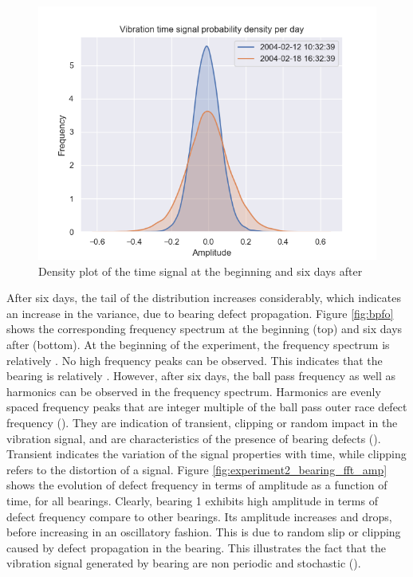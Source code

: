 \documentclass[../Main/thesis.tex]{subfiles}
\begin{document}
\begin{figure}[H]
	\centering
	\includegraphics[width=0.7\linewidth]{../fig/bpfo/density_bpfo_signal}
	\caption{Density plot of the time signal at the beginning and six days after}
	\label{fig:bpfo_density}
\end{figure}
\justify
After six days, the tail of the distribution increases considerably, which indicates an increase in the variance, due to bearing defect propagation. Figure \ref{fig:bpfo} shows the corresponding frequency spectrum at the beginning (top) and six days after (bottom). At the beginning of the experiment, the frequency spectrum is relatively . No high frequency peaks can be observed. This indicates that the bearing is relatively . However, after six days, the ball pass frequency as well as harmonics can be observed in the frequency spectrum.
\justify
Harmonics are evenly spaced frequency peaks that are integer multiple of the ball pass outer race defect frequency (\cite{mobius2014}). They are indication of transient, clipping or random impact in the vibration signal, and are characteristics of the presence of bearing defects (\cite{mobius2014}). Transient indicates the variation of the signal properties with time, while clipping refers to the distortion of a signal. 
\justify
 Figure \ref{fig:experiment2_bearing_fft_amp} shows the evolution of defect frequency in terms of amplitude as a function of time, for all  bearings. Clearly, bearing 1 exhibits high amplitude in terms of defect frequency compare to other bearings. Its amplitude increases and drops, before increasing in an oscillatory fashion. This is due to random slip or clipping caused by defect propagation in the bearing. This illustrates the fact that the vibration signal generated by bearing are non periodic and stochastic (\cite{randal2011}).
\end{document}
